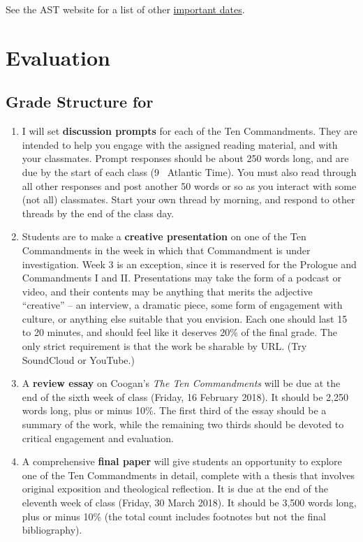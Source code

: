 \documentclass[titlepage]{article}
\begin{document}
See the AST website for a list of other \href{http://www.astheology.ns.ca/students/academic-dates.html}{important dates}.

\section{Evaluation}
\label{evaluation}

\subsection{Grade Structure for \ccode}
\label{structure}

\begin{enumerate}

	\item I will set \textbf{discussion prompts} for each of the Ten
	Commandments. They are intended to help you engage with the assigned
	reading material, and with your classmates. Prompt responses should
	be about 250 words long, and are due by the start of each class (9
	\AM\ Atlantic Time). You must also read through all other responses
	and post another 50 words or so as you interact with some (not all)
	classmates. Start your own thread by morning, and respond to other
	threads by the end of the class day.

	\item Students are to make a \textbf{creative presentation} on one
	of the Ten Commandments in the week in which that Commandment is
	under investigation. Week 3 is an exception, since it is reserved
	for the Prologue and Commandments I and II. Presentations may take
	the form of a podcast or video, and their contents may be anything
	that merits the adjective “creative” -- an interview, a dramatic
	piece, some form of engagement with culture, or anything else
	suitable that you envision. Each one should last 15 to 20 minutes,
	and should feel like it deserves 20\% of the final grade. The only
	strict requirement is that the work be sharable by URL. (Try
	SoundCloud or YouTube.)

	\item A \textbf{review essay} on Coogan's \emph{The Ten
	Commandments} will be due at the end of the sixth week of class
	(Friday, 16 February 2018). It should be 2,250 words long, plus or
	minus 10\%. The first third of the essay should be a summary of the
	work, while the remaining two thirds should be devoted to critical
	engagement and evaluation.

	\item A comprehensive \textbf{final paper} will give students an
	opportunity to explore one of the Ten Commandments in detail,
	complete with a thesis that involves original exposition and
	theological reflection. It is due at the end of the eleventh week of
	class (Friday, 30 March 2018). It should be 3,500 words long, plus
	or minus 10\% (the total count includes footnotes but not the final
	bibliography).

\end{enumerate}
\end{document}
